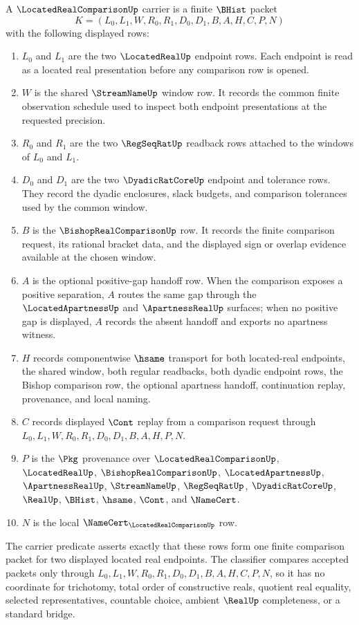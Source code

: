 \begin{definition}
\label{def:located-real-comparison-carrier}
A $\LocatedRealComparisonUp$ carrier is a finite $\BHist$ packet
$$
K=(L_0,L_1,W,R_0,R_1,D_0,D_1,B,A,H,C,P,N)
$$
with the following displayed rows:
\begin{enumerate}
\item $L_0$ and $L_1$ are the two $\LocatedRealUp$ endpoint rows. Each endpoint is read as a located real presentation before any comparison row is opened.
\item $W$ is the shared $\StreamNameUp$ window row. It records the common finite observation schedule used to inspect both endpoint presentations at the requested precision.
\item $R_0$ and $R_1$ are the two $\RegSeqRatUp$ readback rows attached to the windows of $L_0$ and $L_1$.
\item $D_0$ and $D_1$ are the two $\DyadicRatCoreUp$ endpoint and tolerance rows. They record the dyadic enclosures, slack budgets, and comparison tolerances used by the common window.
\item $B$ is the $\BishopRealComparisonUp$ row. It records the finite comparison request, its rational bracket data, and the displayed sign or overlap evidence available at the chosen window.
\item $A$ is the optional positive-gap handoff row. When the comparison exposes a positive separation, $A$ routes the same gap through the $\LocatedApartnessUp$ and $\ApartnessRealUp$ surfaces; when no positive gap is displayed, $A$ records the absent handoff and exports no apartness witness.
\item $H$ records componentwise $\hsame$ transport for both located-real endpoints, the shared window, both regular readbacks, both dyadic endpoint rows, the Bishop comparison row, the optional apartness handoff, continuation replay, provenance, and local naming.
\item $C$ records displayed $\Cont$ replay from a comparison request through $L_0,L_1,W,R_0,R_1,D_0,D_1,B,A,H,P,N$.
\item $P$ is the $\Pkg$ provenance over $\LocatedRealComparisonUp$, $\LocatedRealUp$, $\BishopRealComparisonUp$, $\LocatedApartnessUp$, $\ApartnessRealUp$, $\StreamNameUp$, $\RegSeqRatUp$, $\DyadicRatCoreUp$, $\RealUp$, $\BHist$, $\hsame$, $\Cont$, and $\NameCert$.
\item $N$ is the local $\NameCert_{\LocatedRealComparisonUp}$ row.
\end{enumerate}
The carrier predicate asserts exactly that these rows form one finite comparison packet for two displayed located real endpoints. The classifier compares accepted packets only through $L_0,L_1,W,R_0,R_1,D_0,D_1,B,A,H,C,P,N$, so it has no coordinate for trichotomy, total order of constructive reals, quotient real equality, selected representatives, countable choice, ambient $\RealUp$ completeness, or a standard bridge.
\end{definition}

